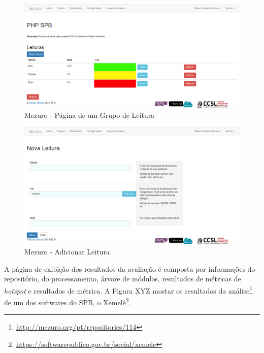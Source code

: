 \newpage

\begin{figure}[!htb]
	\centering
    \includegraphics[keepaspectratio=true,scale=0.3]
    {figuras/mezuro-leitura-view.eps}
  \caption{Mezuro - Página de um Grupo de Leitura}
	\label{fig:mezuro-leitura-view}
\end{figure}

\begin{figure}[!htb]
	\centering
    \includegraphics[keepaspectratio=true,scale=0.3]
    {figuras/mezuro-leitura-add.eps}
  \caption{Mezuro - Adicionar Leitura}
	\label{fig:mezuro-leitura-add}
\end{figure}

\newpage

A página de exibição dos resultados da avaliação é composta por informações do
repositório, do processamento, árvore de módulos, resultados de métricas de
\textit{hotspot} e resultados de métrica. A Figura XYZ mostar os resultados da
análise\footnote{\url{http://mezuro.org/pt/repositories/114}} de um dos
softwares do SPB, o Xemelê\footnote{\url{https://softwarepublico.gov.br/social/xemele}}.


